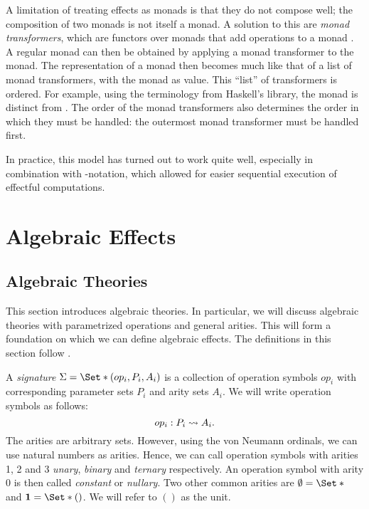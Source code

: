 A limitation of treating effects as monads is that they do not compose well; the composition of two monads is not itself a monad. A solution to this are \emph{monad transformers}, which are functors over monads that add operations to a monad \autocite{moggi_abstract_1989}. A regular monad can then be obtained by applying a monad transformer to the  monad. The representation of a monad then becomes much like that of a list of monad transformers, with the  monad as  value. This ``list'' of transformers is ordered. For example, using the terminology from Haskell's  library, the monad  is distinct from . The order of the monad transformers also determines the order in which they must be handled: the outermost monad transformer must be handled first.

In practice, this model has turned out to work quite well, especially in combination with -notation, which allowed for easier sequential execution of effectful computations.

\section{Algebraic Effects}\label{sec:alg}


\subsection{Algebraic Theories}

This section introduces algebraic theories. In particular, we will discuss algebraic theories with parametrized operations and general arities. This will form a foundation on which we can define algebraic effects. The definitions in this section follow \textcite{bauer_what_2018}.


\begin{definition}[Signature]
    A \emph{signature} $\Sig = \S{(op_i, P_i, A_i)}$ is a collection of operation symbols $op_i$ with corresponding parameter sets $P_i$ and arity sets $A_i$. We will write operation symbols as follows:
    \[ op_i : P_i \rightsquigarrow A_i. \]
    The arities are arbitrary sets. However, using the von Neumann ordinals, we can use natural numbers as arities. Hence, we can call operation symbols with arities 1, 2 and 3 \emph{unary}, \emph{binary} and \emph{ternary} respectively. An operation symbol with arity $0$ is then called \emph{constant} or \emph{nullary}. Two other common arities are $\emptyset = \S{}$ and $\mathbf{1} = \S{()}$. We will refer to $()$ as the unit.
\end{definition}

